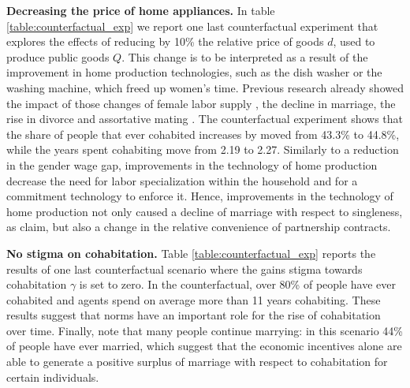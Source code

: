 \documentclass[12pt]{article}
\numberwithin{table}{section}
\begin{document}
\textbf{Decreasing the price of home appliances.} In table \ref{table:counterfactual_exp} we report one last counterfactual experiment that explores the effects of reducing by 10\% the relative price of goods $d$, used to produce public goods $Q$. This change is to be interpreted as a result of the improvement in home production technologies, such as the dish washer or the washing machine, which freed up women's time. Previous research already showed the impact of those changes of female labor supply \citep{greenwood2005}, the decline in marriage, the rise in divorce and assortative mating  \citep{greenwood2016}. The counterfactual experiment shows that the share of people that ever cohabited  increases by moved from 43.3\% to 44.8\%, while the years spent cohabiting move from 2.19 to 2.27. Similarly to a reduction in the gender wage gap, improvements in the technology of home production decrease the need for labor specialization within the household and for a commitment technology to enforce it. Hence, improvements in the technology of home production not only caused a decline of marriage with respect to singleness, as \cite{greenwood2016} claim, but also a change in the relative convenience of partnership contracts.

\textbf{No stigma on cohabitation.} Table \ref{table:counterfactual_exp} reports the results of one last counterfactual scenario where the gains stigma towards cohabitation $\gamma$ is set to zero. In the counterfactual, over 80\% of people have ever cohabited and agents spend on average more than 11 years cohabiting. These results suggest that norms have an important role for the rise of cohabitation over time. Finally, note that many people continue marrying: in this scenario 44\% of people have ever married, which suggest that the economic incentives alone are able to generate a positive surplus of marriage with respect to cohabitation for certain individuals.
\end{document}
